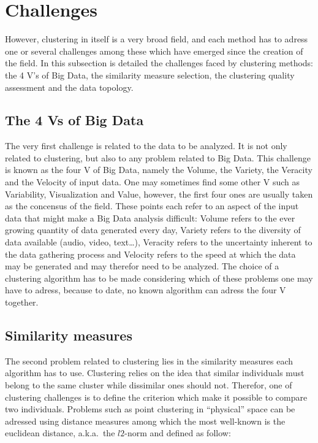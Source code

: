     \section{Challenges}
    However, clustering in itself is a very broad field, and each method has to adress one or several challenges among these which have emerged since the creation of the field. In this subsection is detailed the challenges faced by clustering methods: the 4 V's of Big Data, the similarity measure selection, the clustering quality assessment and the data topology.
    
    \subsection{The 4 Vs of Big Data}
    The very first challenge is related to the data to be analyzed. It is not only related to clustering, but also to any problem related to Big Data. This challenge is known as the four V of Big Data, namely the Volume, the Variety, the Veracity and the Velocity of input data. One may sometimes find some other V such as Variability, Visualization and Value, however, the first four ones are usually taken as the concensus of the field. These points each refer to an aspect of the input data that might make a Big Data analysis difficult: Volume refers to the ever growing quantity of data generated every day, Variety refers to the diversity of data available (audio, video, text\ldots), Veracity refers to the uncertainty inherent to the data gathering process and Velocity refers to the speed at which the data may be generated and may therefor need to be analyzed. The choice of a clustering algorithm has to be made considering which of these problems one may have to adress, because to date, no known algorithm can adress the four V together.

    \subsection{Similarity measures}
    The second problem related to clustering lies in the similarity measures each algorithm has to use. Clustering relies on the idea that similar individuals must belong to the same cluster while dissimilar ones should not. Therefor, one of clustering challenges is to define the criterion which make it possible to compare two individuals. Problems such as point clustering in ``physical'' space can be adressed using distance measures among which the most well-known is the euclidean distance, a.k.a.\ the $l2$-norm and defined as follow: 
    
